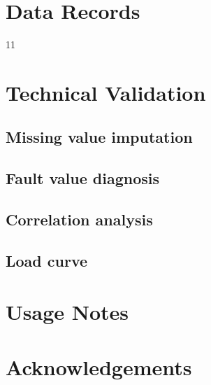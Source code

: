 \documentclass[12pt]{article}
\begin{document}
\section*{Data Records}


11
\section*{Technical Validation}
\subsection*{Missing value imputation}

\subsection*{Fault value diagnosis}

\subsection*{Correlation analysis}
\subsection*{Load curve}

\section*{Usage Notes}

\section*{Acknowledgements}

\end{document}

